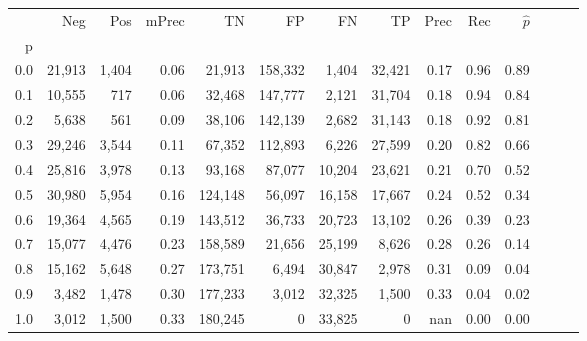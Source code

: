\begin{tabular}{rrrrrrrrrrrrrr}
\toprule
{} &     Neg &    Pos & mPrec &       TN &       FP &      FN &      TP &  Prec &   Rec & $\hat{p}$ \\
p   &         &        &       &          &          &         &         &       &       &           \\
\midrule
0.0 &  21,913 &  1,404 &  0.06 &   21,913 &  158,332 &   1,404 &  32,421 &  0.17 &  0.96 &      0.89 \\
0.1 &  10,555 &    717 &  0.06 &   32,468 &  147,777 &   2,121 &  31,704 &  0.18 &  0.94 &      0.84 \\
0.2 &   5,638 &    561 &  0.09 &   38,106 &  142,139 &   2,682 &  31,143 &  0.18 &  0.92 &      0.81 \\
0.3 &  29,246 &  3,544 &  0.11 &   67,352 &  112,893 &   6,226 &  27,599 &  0.20 &  0.82 &      0.66 \\
0.4 &  25,816 &  3,978 &  0.13 &   93,168 &   87,077 &  10,204 &  23,621 &  0.21 &  0.70 &      0.52 \\
0.5 &  30,980 &  5,954 &  0.16 &  124,148 &   56,097 &  16,158 &  17,667 &  0.24 &  0.52 &      0.34 \\
0.6 &  19,364 &  4,565 &  0.19 &  143,512 &   36,733 &  20,723 &  13,102 &  0.26 &  0.39 &      0.23 \\
0.7 &  15,077 &  4,476 &  0.23 &  158,589 &   21,656 &  25,199 &   8,626 &  0.28 &  0.26 &      0.14 \\
0.8 &  15,162 &  5,648 &  0.27 &  173,751 &    6,494 &  30,847 &   2,978 &  0.31 &  0.09 &      0.04 \\
0.9 &   3,482 &  1,478 &  0.30 &  177,233 &    3,012 &  32,325 &   1,500 &  0.33 &  0.04 &      0.02 \\
1.0 &   3,012 &  1,500 &  0.33 &  180,245 &        0 &  33,825 &       0 &   nan &  0.00 &      0.00 \\
\bottomrule
\end{tabular}
